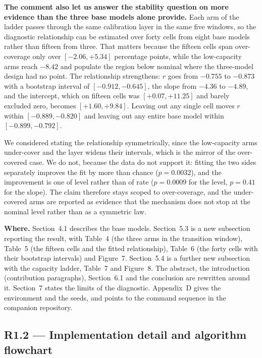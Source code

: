 \documentclass[11pt,a4paper]{article}
\newcommand{\where}[1]{\textbf{Where.} #1}
\begin{document}
\textbf{The comment also let us answer the stability question on more evidence than the three base models alone provide.} Each arm of the ladder passes through the same calibration layer in the same five windows, so the diagnostic relationship can be estimated over forty cells from eight base models rather than fifteen from three. That matters because the fifteen cells span over-coverage only over $[-2.06, +5.34]$ percentage points, while the low-capacity arms reach $-8.42$ and populate the region below nominal where the three-model design had no point. The relationship strengthens: $r$ goes from $-0.755$ to $-0.873$ with a bootstrap interval of $[-0.912, -0.645]$, the slope from $-4.36$ to $-4.89$, and the intercept, which on fifteen cells was $[+0.07, +11.25]$ and barely excluded zero, becomes $[+1.60, +9.84]$. Leaving out any single cell moves $r$ within $[-0.889, -0.820]$ and leaving out any entire base model within $[-0.899, -0.792]$.

We considered stating the relationship symmetrically, since the low-capacity arms under-cover and the layer widens their intervals, which is the mirror of the over-covered case. We do not, because the data do not support it: fitting the two sides separately improves the fit by more than chance ($p=0.0032$), and the improvement is one of level rather than of rate ($p=0.0009$ for the level, $p=0.41$ for the slope). The claim therefore stays scoped to over-coverage, and the under-covered arms are reported as evidence that the mechanism does not stop at the nominal level rather than as a symmetric law.

\where{Section~4.1 describes the base models. Section~5.3 is a new subsection reporting the result, with Table~4 (the three arms in the transition window), Table~5 (the fifteen cells and the fitted relationship), Table~6 (the forty cells with their bootstrap intervals) and Figure~7. Section~5.4 is a further new subsection with the capacity ladder, Table~7 and Figure~8. The abstract, the introduction (contribution paragraphs), Section~6.1 and the conclusion are rewritten around it. Section~7 states the limits of the diagnostic. Appendix~D gives the environment and the seeds, and points to the command sequence in the companion repository.}

\subsection*{R1.2 --- Implementation detail and algorithm flowchart}
\end{document}
